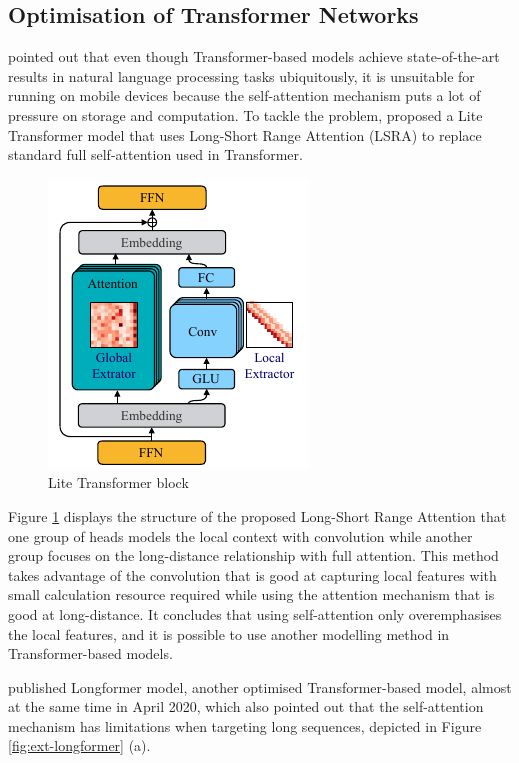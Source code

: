 \subsection{Optimisation of Transformer Networks}
\label{subsec:Optimisation of Transformer Networks}
\citet{wu2020lite} pointed out that even though Transformer-based models achieve state-of-the-art results in natural language processing tasks ubiquitously, it is unsuitable for running on mobile devices because the self-attention mechanism puts a lot of pressure on storage and computation.
To tackle the problem, \citet{wu2020lite} proposed a Lite Transformer model that uses Long-Short Range Attention (LSRA) to replace standard full self-attention used in Transformer.

\begin{figure}
    \vspace*{-1em}
    \includegraphics[width=.48\textwidth]{literature/imgs/ext-2-lite-transformer.pdf}
    \caption{Lite Transformer block \cite{wu2020lite}}
    \label{fig:ext-2-lite-transformer}
\end{figure}

Figure \ref{fig:ext-2-lite-transformer} displays the structure of the proposed Long-Short Range Attention that one group of heads models the local context with convolution while another group focuses on the long-distance relationship with full attention.
This method takes advantage of the convolution that is good at capturing local features with small calculation resource required while using the attention mechanism that is good at long-distance.
It concludes that using self-attention only overemphasises the local features, and it is possible to use another modelling method in Transformer-based models.

\citet{beltagy2020longformer} published Longformer model, another optimised Transformer-based model, almost at the same time in April 2020, which also pointed out that the self-attention mechanism has limitations when targeting long sequences, depicted in Figure \ref{fig:ext-longformer} (a).

